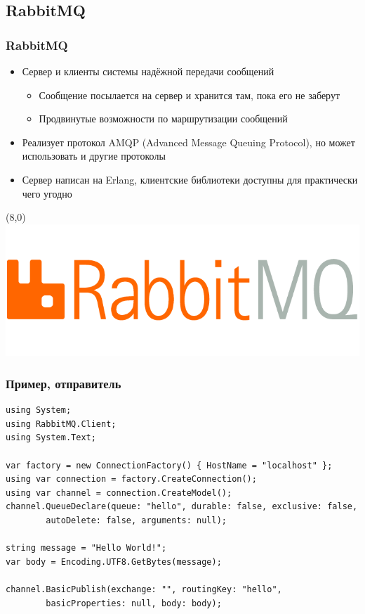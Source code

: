 \documentclass{../../slides-style}
\begin{document}
    \subsection{RabbitMQ}

    \begin{frame}
        \frametitle{RabbitMQ}
        \begin{itemize}
            \item Сервер и клиенты системы надёжной передачи сообщений
            \begin{itemize}
                \item Сообщение посылается на сервер и хранится там, пока его не заберут
                \item Продвинутые возможности по маршрутизации сообщений
            \end{itemize}
            \item Реализует протокол AMQP (Advanced Message Queuing Protocol), но может использовать и другие протоколы
            \item Сервер написан на Erlang, клиентские библиотеки доступны для практически чего угодно
        \end{itemize}
        \begin{textblock}{3}(8,0)
            \includegraphics[width=\textwidth]{rabbitmqLogo.png}
        \end{textblock}
    \end{frame}

    \begin{frame}[fragile]
        \frametitle{Пример, отправитель}
        \begin{ssmall}
            \begin{verbatim}
using System;
using RabbitMQ.Client;
using System.Text;

var factory = new ConnectionFactory() { HostName = "localhost" };
using var connection = factory.CreateConnection();
using var channel = connection.CreateModel();
channel.QueueDeclare(queue: "hello", durable: false, exclusive: false,
        autoDelete: false, arguments: null);

string message = "Hello World!";
var body = Encoding.UTF8.GetBytes(message);

channel.BasicPublish(exchange: "", routingKey: "hello",
        basicProperties: null, body: body);
            \end{verbatim}
        \end{ssmall}
    \end{frame}
\end{document}
